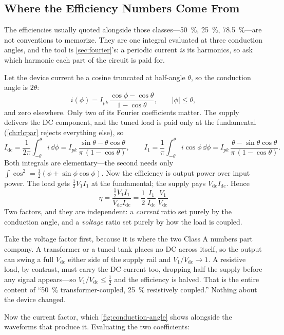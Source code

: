 \subsection{Where the Efficiency Numbers Come From}
\label{sec:conductionangle}
The efficiencies usually quoted alongside those classes---\SI{50}{\percent},
\SI{25}{\percent}, \SI{78.5}{\percent}---are not conventions to memorize. They are one
integral evaluated at three conduction angles, and the tool is
\cref{sec:fourier}'s: a periodic current \emph{is} its harmonics, so ask which
harmonic each part of the circuit is paid for.

Let the device current be a cosine truncated at half-angle \(\theta\), so the
conduction angle is \(2\theta\):
\[
i(\phi)=I_{pk}\,\frac{\cos\phi-\cos\theta}{1-\cos\theta},
\qquad |\phi|\le\theta,
\]
and zero elsewhere. Only two of its Fourier coefficients matter. The supply delivers
the DC component, and the tuned load is paid only at the fundamental
(\cref{ch:rlcpar} rejects everything else), so
\[
I_{\mathrm{dc}}=\frac{1}{2\pi}\int_{-\theta}^{\theta}\!i\,\dd\phi
=I_{pk}\,\frac{\sin\theta-\theta\cos\theta}{\pi\,(1-\cos\theta)},
\qquad
I_1=\frac{1}{\pi}\int_{-\theta}^{\theta}\!i\cos\phi\,\dd\phi
=I_{pk}\,\frac{\theta-\sin\theta\cos\theta}{\pi\,(1-\cos\theta)} .
\]
Both integrals are elementary---the second needs only
\(\int\cos^2=\tfrac12(\phi+\sin\phi\cos\phi)\). Now the efficiency is output power over
input power. The load gets \(\tfrac12V_1I_1\) at the fundamental; the supply pays
\(V_{\mathrm{dc}}I_{\mathrm{dc}}\). Hence
\[
\boxed{\;\eta=\frac{\tfrac12V_1I_1}{V_{\mathrm{dc}}I_{\mathrm{dc}}}
=\frac{1}{2}\,\frac{I_1}{I_{\mathrm{dc}}}\,\frac{V_1}{V_{\mathrm{dc}}}\;}
\]
Two factors, and they are independent: a \emph{current} ratio set purely by the
conduction angle, and a \emph{voltage} ratio set purely by how the load is coupled.

Take the voltage factor first, because it is where the two Class A numbers part
company. A transformer or a tuned tank places no DC across itself, so the output can
swing a full \(V_{\mathrm{dc}}\) either side of the supply rail and
\(V_1/V_{\mathrm{dc}}\to1\). A resistive load, by contrast, must carry the DC current
too, dropping half the supply before any signal appears---so
\(V_1/V_{\mathrm{dc}}\le\tfrac12\) and the efficiency is halved. That is the entire
content of ``\SI{50}{\percent} transformer-coupled, \SI{25}{\percent} resistively
coupled.'' Nothing about the device changed.

Now the current factor, which \cref{fig:conduction-angle} shows alongside the
waveforms that produce it. Evaluating the two coefficients:

